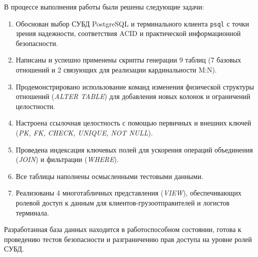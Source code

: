 \documentclass[a4paper,14pt]{article}
\begin{document}
В процессе выполнения работы были решены следующие задачи:
\begin{enumerate}
    \item Обоснован выбор СУБД PostgreSQL и терминального клиента \texttt{psql} с точки зрения надежности, соответствия ACID и практической информационной безопасности.
    \item Написаны и успешно применены скрипты генерации 9 таблиц (7 базовых отношений и 2 связующих для реализации кардинальности M:N).
    \item Продемонстрировано использование команд изменения физической структуры отношений (\textit{ALTER TABLE}) для добавления новых колонок и ограничений целостности.
    \item Настроена ссылочная целостность с помощью первичных и внешних ключей (\textit{PK, FK, CHECK, UNIQUE, NOT NULL}).
    \item Проведена индексация ключевых полей для ускорения операций объединения (\textit{JOIN}) и фильтрации (\textit{WHERE}).
    \item Все таблицы наполнены осмысленными тестовыми данными.
    \item Реализованы 4 многотабличных представления (\textit{VIEW}), обеспечивающих ролевой доступ к данным для клиентов-грузоотправителей и логистов терминала.
\end{enumerate}

Разработанная база данных находится в работоспособном состоянии, готова к проведению тестов безопасности и разграничению прав доступа на уровне ролей СУБД.
\end{document}
